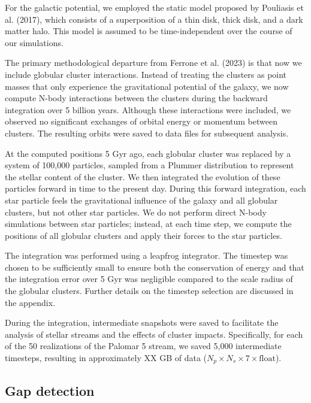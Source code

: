\documentclass[draft]{aa}
\begin{document}
    For the galactic potential, we employed the static model proposed by Pouliasis et al. (2017), which consists of a superposition of a thin disk, thick disk, and a dark matter halo. This model is assumed to be time-independent over the course of our simulations.

    The primary methodological departure from Ferrone et al. (2023) is that now we include globular cluster interactions. Instead of treating the clusters as point masses that only experience the gravitational potential of the galaxy, we now compute N-body interactions between the clusters during the backward integration over 5 billion years. Although these interactions were included, we observed no significant exchanges of orbital energy or momentum between clusters. The resulting orbits were saved to data files for subsequent analysis.

    At the computed positions 5 Gyr ago, each globular cluster was replaced by a system of 100,000 particles, sampled from a Plummer distribution to represent the stellar content of the cluster. We then integrated the evolution of these particles forward in time to the present day. During this forward integration, each star particle feels the gravitational influence of the galaxy and all globular clusters, but not other star particles. We do not perform direct N-body simulations between star particles; instead, at each time step, we compute the positions of all globular clusters and apply their forces to the star particles.

    The integration was performed using a leapfrog integrator. The timestep was chosen to be sufficiently small to ensure both the conservation of energy and that the integration error over 5 Gyr was negligible compared to the scale radius of the globular clusters. Further details on the timestep selection are discussed in the appendix.

    During the integration, intermediate snapshots were saved to facilitate the analysis of stellar streams and the effects of cluster impacts. Specifically, for each of the 50 realizations of the Palomar 5 stream, we saved 5,000 intermediate timesteps, resulting in approximately XX GB of data ($N_p \times N_s \times 7 \times \text{float}$).




  \subsection{Gap detection}
\end{document}
